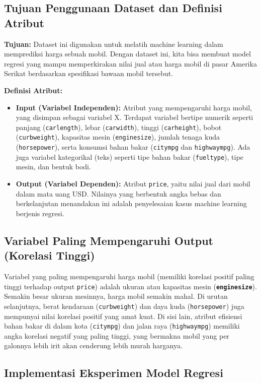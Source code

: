 \subsection{Tujuan Penggunaan Dataset dan Definisi Atribut}
\textbf{Tujuan:} Dataset ini digunakan untuk melatih machine learning dalam memprediksi harga sebuah mobil. Dengan dataset ini, kita bisa membuat model regresi yang mampu memperkirakan nilai jual atau harga mobil di pasar Amerika Serikat berdasarkan spesifikasi bawaan mobil tersebut.

\textbf{Definisi Atribut:}
\begin{itemize}
    \item \textbf{Input (Variabel Independen):} Atribut yang mempengaruhi harga mobil, yang disimpan sebagai variabel X. Terdapat variabel bertipe numerik seperti panjang (\texttt{carlength}), lebar (\texttt{carwidth}), tinggi (\texttt{carheight}), bobot (\texttt{curbweight}), kapasitas mesin (\texttt{enginesize}), jumlah tenaga kuda (\texttt{horsepower}), serta konsumsi bahan bakar (\texttt{citympg} dan \texttt{highwaympg}). Ada juga variabel kategorikal (teks) seperti tipe bahan bakar (\texttt{fueltype}), tipe mesin, dan bentuk bodi.
    \item \textbf{Output (Variabel Dependen):} Atribut \texttt{price}, yaitu nilai jual dari mobil dalam mata uang USD. Nilainya yang berbentuk angka bebas dan berkelanjutan menandakan ini adalah penyelesaian kasus machine learning berjenis regresi.
\end{itemize}

\subsection{Variabel Paling Mempengaruhi Output (Korelasi Tinggi)}
Variabel yang paling mempengaruhi harga mobil (memiliki korelasi positif paling tinggi terhadap output \texttt{price}) adalah ukuran atau kapasitas mesin (\textbf{\texttt{enginesize}}). Semakin besar ukuran mesinnya, harga mobil semakin mahal. Di urutan selanjutnya, berat kendaraan (\texttt{curbweight}) dan daya kuda (\texttt{horsepower}) juga mempunyai nilai korelasi positif yang amat kuat.
Di sisi lain, atribut efisiensi bahan bakar di dalam kota (\texttt{citympg}) dan jalan raya (\texttt{highwaympg}) memiliki angka korelasi negatif yang paling tinggi, yang bermakna mobil yang per galonnya lebih irit akan cenderung lebih murah harganya.

\subsection{Implementasi Eksperimen Model Regresi}

